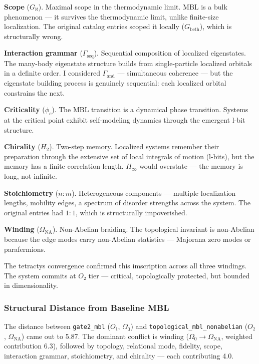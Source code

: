 \documentclass[12pt,a4paper]{article}
\begin{document}
\textbf{Scope} ($G_{\aleph}$). Maximal scope in the thermodynamic limit. MBL is a bulk phenomenon --- it survives the thermodynamic limit, unlike finite-size localization. The original catalog entries scoped it locally ($G_{\text{beth}}$), which is structurally wrong.

\textbf{Interaction grammar} ($\Gamma_\text{seq}$). Sequential composition of localized eigenstates. The many-body eigenstate structure builds from single-particle localized orbitals in a definite order. I considered $\Gamma_\text{and}$ --- simultaneous coherence --- but the eigenstate building process is genuinely sequential: each localized orbital constrains the next.

\textbf{Criticality} ($\phi_c$). The MBL transition is a dynamical phase transition. Systems at the critical point exhibit self-modeling dynamics through the emergent l-bit structure.

\textbf{Chirality} ($H_2$). Two-step memory. Localized systems remember their preparation through the extensive set of local integrals of motion (l-bits), but the memory has a finite correlation length. $H_{\infty}$ would overstate --- the memory is long, not infinite.

\textbf{Stoichiometry} ($n{:}m$). Heterogeneous components --- multiple localization lengths, mobility edges, a spectrum of disorder strengths across the system. The original entries had $1{:}1$, which is structurally impoverished.

\textbf{Winding} ($\Omega_\text{NA}$). Non-Abelian braiding. The topological invariant is non-Abelian because the edge modes carry non-Abelian statistics --- Majorana zero modes or parafermions.

The tetractys convergence confirmed this imscription across all three windings. The system commits at $O₂$ tier --- critical, topologically protected, but bounded in dimensionality.

\subsubsection{Structural Distance from Baseline MBL}

The distance between \texttt{gate2\_mbl} ($O₁$, $\Omega_0$) and \texttt{topological\_mbl\_nonabelian} ($O₂$, $\Omega_\text{NA}$) came out to 5.87. The dominant conflict is winding ($\Omega_0 \to \Omega_\text{NA}$, weighted contribution 6.3), followed by topology, relational mode, fidelity, scope, interaction grammar, stoichiometry, and chirality --- each contributing 4.0.
\end{document}
